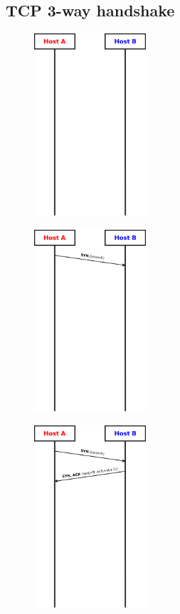 \documentclass{beamer}
\begin{document}
\subsection*{TCP 3-way handshake}
\begin{frame}[allowframebreaks]{\insertsection}{\insertsubsection}
\begin{figure}
\includegraphics[width=0.37\textwidth]{imgs/tcp-3-way-handshake-00.drawio.png}
\end{figure}
\framebreak
\begin{figure}
\includegraphics[width=0.37\textwidth]{imgs/tcp-3-way-handshake-01.drawio.png}
\end{figure}
\framebreak
\begin{figure}
\includegraphics[width=0.37\textwidth]{imgs/tcp-3-way-handshake-02.drawio.png}

\end{figure}
\end{frame}
\end{document}
